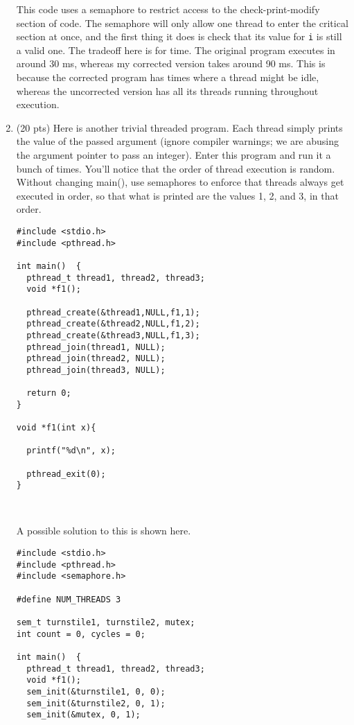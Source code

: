 \documentclass[12pt]{article}
\begin{document}
\begin{enumerate}
This code uses a semaphore to restrict access to the check-print-modify section of
code. The semaphore will only allow one thread to enter the critical section at
once, and the first thing it does is check that its value for \verb#i# is still
a valid one. The tradeoff here is for time. The original program executes in
around 30 ms, whereas my corrected version takes around 90 ms. This is because
the corrected program has times where a thread might be idle, whereas the
uncorrected version has all its threads running throughout execution.

\item (20 pts) Here is another trivial threaded program. Each thread simply
  prints the value of the passed argument (ignore compiler warnings;
  we are abusing the argument pointer to pass an integer). Enter this
  program and run it a bunch of times. You'll notice that the order of
  thread execution is random. Without changing main(), use semaphores
  to enforce that threads always get executed in order, so that what
  is printed are the values 1, 2, and 3, in that order. 

  \begin{Verbatim}[fontsize=\scriptsize]
#include <stdio.h>
#include <pthread.h>

int main()  {
  pthread_t thread1, thread2, thread3;
  void *f1();

  pthread_create(&thread1,NULL,f1,1);
  pthread_create(&thread2,NULL,f1,2);
  pthread_create(&thread3,NULL,f1,3);
  pthread_join(thread1, NULL);
  pthread_join(thread2, NULL);
  pthread_join(thread3, NULL);

  return 0;
}

void *f1(int x){
  
  printf("%d\n", x);

  pthread_exit(0);
}



  \end{Verbatim}

  A possible solution to this is shown here.
  
\begin{Verbatim}[fontsize = \scriptsize]
#include <stdio.h>
#include <pthread.h>
#include <semaphore.h>

#define NUM_THREADS 3

sem_t turnstile1, turnstile2, mutex;
int count = 0, cycles = 0;

int main()  {
  pthread_t thread1, thread2, thread3;
  void *f1();
  sem_init(&turnstile1, 0, 0);
  sem_init(&turnstile2, 0, 1);
  sem_init(&mutex, 0, 1);


\end{Verbatim}
\end{enumerate}
\end{document}
